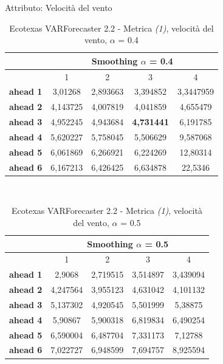 \documentclass[12pt,a4paper,oneside,openright]{book}
\begin{document}
Attributo: Velocità del vento \\ 

\begin{table}[H]
\centering
\begin{tabular}{|c|c|c|c|c|}
\hline
 & \multicolumn{4}{|c|}{Smoothing $\alpha$ = 0.4} \\
\hline
& 1 & 2 & 3 & 4 \\
\hline
\textbf{ahead 1} & 3,01268 & 2,893663 & 3,394852 & 3,3447959\\
\hline
\textbf{ahead 2} & 4,143725 & 4,007819 & 4,041859 & 4,655479\\ 
\hline
\textbf{ahead 3} & 4,952245 & 4,943684 & \textbf{4,731441} & 6,191785\\
\hline
\textbf{ahead 4} &  5,620227& 5,758045 & 5,506629 & 9,587068\\ 
\hline
\textbf{ahead 5} & 6,061869 & 6,266921 & 6,224269 & 12,80314\\
\hline
\textbf{ahead 6} & 6,167213 & 6,426425 & 6,634878 & 22,5346\\ 
\hline
\end{tabular} \\
\caption{Ecotexas VARForecaster 2.2 - Metrica \textit{(1)}, velocità del vento, $\alpha$ = 0.4}
\end{table} 

\medskip

\begin{table}[H]
\centering
\begin{tabular}{|c|c|c|c|c|}
\hline
 & \multicolumn{4}{|c|}{Smoothing $\alpha$ = 0.5} \\
\hline
& 1 & 2 & 3 & 4 \\
\hline
\textbf{ahead 1} & 2,9068 & 2,719515 & 3,514897 & 3,439094\\
\hline
\textbf{ahead 2} & 4,247564 & 3,955123 & 4,631042 & 4,101132\\ 
\hline
\textbf{ahead 3} & 5,137302 & 4,920545 & 5,501999 & 5,38875\\
\hline
\textbf{ahead 4} & 5,90867 & 5,900318 & 6,819834 & 6,490254\\ 
\hline
\textbf{ahead 5} & 6,590004 & 6,487704 & 7,331173 & 7,12788\\
\hline
\textbf{ahead 6} & 7,022727 & 6,948599 & 7,694757 & 8,925594\\ 
\hline
\end{tabular} \\
\caption{Ecotexas VARForecaster 2.2 - Metrica \textit{(1)}, velocità del vento, $\alpha$ = 0.5}
\end{table} 
\end{document}
